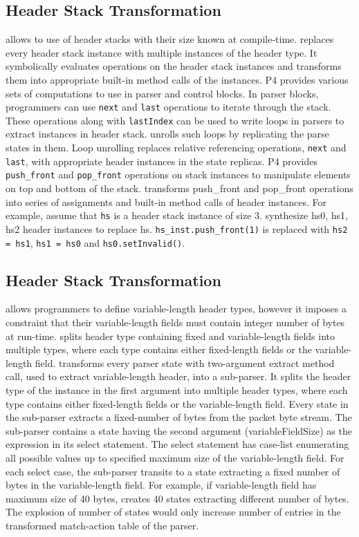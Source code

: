 \documentclass[letterpaper,twocolumn,10pt]{article}
\begin{document}
\subsection{Header Stack Transformation}
\label{subsection:header-stack-transformation}
\ulang allows to use of header stacks with their size known at 
compile-time. 
\ucomp replaces every header stack instance with multiple instances of 
the header type. 
It symbolically evaluates operations on the header stack instances and 
transforms them into appropriate built-in method calls of the 
instances.
P4 provides various sets of computations to use in parser and control 
blocks.
In parser blocks, programmers can use \texttt{next} and \texttt{last} 
operations to iterate through the stack.
These operations along with \texttt{lastIndex} can be used to write 
loops in parsers to extract instances in header stack.
\ucomp unrolls such loops by replicating the parse states in them.
Loop unrolling replaces relative referencing operations, \texttt{next} 
and \texttt{last}, with appropriate header instances in the state 
replicas.
P4 provides \texttt{push\_front} and \texttt{pop\_front} operations on 
stack instances to manipulate elements on top and bottom of the stack.
\ucomp transforms push\_front and pop\_front operations into series of 
assignments and built-in method calls of header instances.
For example, assume that \texttt{hs} is a header stack instance of 
size 3. 
\ucomp synthesize hs0, hs1, hs2 header instances to replace hs.
\texttt{hs\_inst.push\_front(1)} is replaced with \texttt{hs2 = hs1}, 
\texttt{hs1 = hs0} and \texttt{hs0.setInvalid()}.


\subsection{Header Stack Transformation}
\label{subsection:header-stack-transformation}
\ulang allows programmers to define variable-length header types, 
however it imposes a constraint that their variable-length fields must 
contain integer number of bytes at run-time.
\ucomp splits header type containing fixed and variable-length 
fields into multiple types, where each type contains either 
fixed-length fields or the variable-length field.
\ucomp transforms every parser state with two-argument extract method 
call, used to extract variable-length header, into a sub-parser.
It splits the header type of the instance in the first argument into 
multiple header types, where each type contains either fixed-length 
fields or 
the variable-length field.
Every state in the sub-parser extracts a fixed-number of bytes from 
the packet byte stream.
The sub-parser contains a state having the second argument 
(variableFieldSize) as the expression in its select statement.
The select statement has case-list enumerating all possible values up 
to specified maximum size of the variable-length field.
For each select case, the sub-parser transits to a state extracting a 
fixed number of bytes in the variable-length field.
For example, if variable-length field has maximum size of 40 bytes, 
\ucomp creates 40 states extracting different number of bytes.
The explosion of number of states would only increase number of 
entries in the transformed match-action table of the parser.
\end{document}
